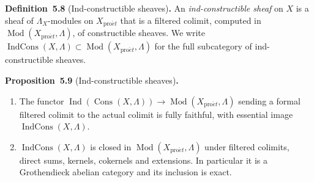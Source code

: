 \documentclass[11pt]{article}
\newenvironment{bpstatement}[2]{\par\addvspace{0.6\baselineskip}\noindent\textbf{#1}#2\textbf{.}\enspace\ignorespaces}
  {\par\addvspace{0.4\baselineskip}}
\newenvironment{bpstatementit}[2]{\begin{bpstatement}{#1}{#2}\itshape\ignorespaces}{\end{bpstatement}}
\providecommand{\Cons}{}\renewcommand{\Cons}{\operatorname{Cons}}
\providecommand{\IndCons}{}\renewcommand{\IndCons}{\operatorname{IndCons}}
\begin{document}
\label{bp26}%
\begin{bpstatement}{Definition~5.8}{ (Ind-constructible sheaves)}
An \emph{ind-constructible sheaf} on \(X\) is a sheaf of \(\Lambda_X\)-modules on \(X_{\mathrm{pro}\acute{e}t}\) that is a filtered colimit, computed in \(\operatorname{Mod}(X_{\mathrm{pro}\acute{e}t},\Lambda)\), of constructible sheaves. We write \(\IndCons(X,\Lambda)\subset\operatorname{Mod}(X_{\mathrm{pro}\acute{e}t},\Lambda)\) for the full subcategory of ind-constructible sheaves.
\end{bpstatement}

\label{bp27}%
\begin{bpstatementit}{Proposition~5.9}{ (Ind-constructible sheaves)}
\begin{enumerate}
\item The functor \(\operatorname{Ind}(\Cons(X,\Lambda))\to\operatorname{Mod}(X_{\mathrm{pro}\acute{e}t},\Lambda)\) sending a formal filtered colimit to the actual colimit is fully faithful, with essential image \(\IndCons(X,\Lambda)\).
\item \(\IndCons(X,\Lambda)\) is closed in \(\operatorname{Mod}(X_{\mathrm{pro}\acute{e}t},\Lambda)\) under filtered colimits, direct sums, kernels, cokernels and extensions. In particular it is a Grothendieck abelian category and its inclusion is exact.
\end{enumerate}
\end{bpstatementit}
\end{document}
